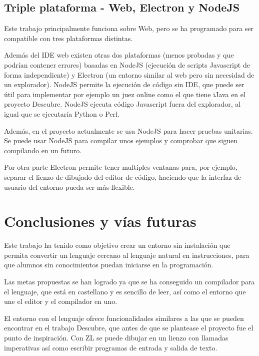 \documentclass{report}
\begin{document}
	\section{Triple plataforma - Web, Electron y NodeJS}
	
	
	Este trabajo principalmente funciona sobre Web, pero se ha programado para ser compatible con tres plataformas distintas. 
	
	Además del IDE web existen otras dos plataformas (menos probadas y que podrían contener errores) basadas en NodeJS (ejecución de scripts Javascript de forma independiente) y Electron (un entorno similar al web pero sin necesidad de un explorador). NodeJS permite la ejecución de código sin IDE, que puede ser útil para implementar por ejemplo un juez online como el que tiene iJava en el proyecto Descubre. NodeJS ejecuta código Javascript fuera del explorador, al igual que se ejecutaría Python o Perl. 
	
	\vspace{10px}
	
	Además, en el proyecto actualmente se usa NodeJS para hacer pruebas unitarias. Se puede usar NodeJS para compilar unos ejemplos y comprobar que siguen compilando en un futuro. 
	
	\vspace{10px}
	
	Por otra parte Electron permite tener multiples ventanas para, por ejemplo, separar el lienzo de dibujado del editor de código, haciendo que la interfaz de usuario del entorno pueda ser más flexible. 
	
	\chapter{Conclusiones y vías futuras}
	
	Este trabajo ha tenido como objetivo crear un entorno sin instalación que permita convertir un lenguaje cercano al lenguaje natural en instrucciones, para que alumnos sin conocimientos puedan iniciarse en la programación. 
	
	Las metas propuestas se han logrado ya que se ha conseguido un compilador para el lenguaje, que está en castellano y es sencillo de leer, así como el entorno que une el editor y el compilador en uno. 
	
	El entorno con el lenguaje ofrece funcionalidades similares a las que se pueden encontrar en el trabajo Descubre, que antes de que se plantease el proyecto fue el punto de inspiración. Con ZL se puede dibujar en un lienzo con llamadas imperativas así como escribir programas de entrada y salida de texto. 
	
\end{document}
